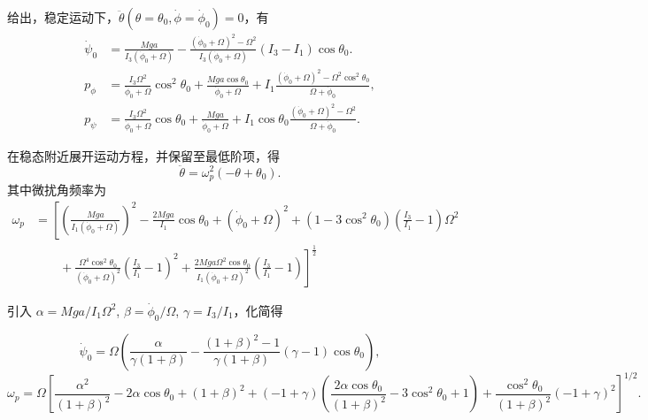 给出，稳定运动下，\(\ddot{\theta} (\theta = \theta_0, \dot{\phi} = \dot{\phi}_0) = 0\)，有
\begin{align*}
	\dot{\psi}_0 & = \frac{M g a}{I_3 (\dot{\phi}_0 + \Omega)} - \frac{(\dot{\phi}_0 + \Omega)^2 - \Omega^2}{I_3 (\dot{\phi}_0 + \Omega)} (I_3 - I_1) \cos \theta_0.                                                        \\
	p_{\phi}     & = \frac{I_3 \Omega^2}{\dot{\phi}_0 + \Omega} \cos^2 \theta_0 + \frac{Mga \cos \theta_0}{\dot{\phi}_0 + \Omega} + I_1 \frac{(\dot{\phi}_0 + \Omega)^2 - \Omega^2 \cos^2 \theta_0}{\Omega + \dot{\phi}_0}, \\
	p_{\psi}     & = \frac{I_3 \Omega^2}{\dot{\phi}_0 + \Omega} \cos \theta_0 + \frac{Mga}{\dot{\phi}_0 + \Omega} + I_1 \cos \theta_0 \frac{(\dot{\phi}_0 + \Omega)^2 - \Omega^2}{\Omega + \dot{\phi}_0}.
\end{align*}

在稳态附近展开运动方程，并保留至最低阶项，得
\begin{equation*}
	\ddot{\theta} =\omega_p^2 (-\theta + \theta_0).
\end{equation*}
其中微扰角频率为
\begin{align*}
	\omega_p & =\left[ \left( \frac{M g a}{I_1 (\dot{\phi}_0 + \Omega)} \right)^2 - \frac{2 M g a}{I_1} \cos \theta_0 + (\dot{\phi}_0 + \Omega)^2 \right. + (1 - 3 \cos^2 \theta_0) \left( \frac{I_3}{I_1} - 1 \right) \Omega^2 \\&\qquad+ \frac{\Omega^4 \cos^2 \theta_0}{(\dot{\phi}_0 + \Omega)^2} \left( \frac{I_3}{I_1} - 1 \right)^2 + \left. \frac{2 M g a \Omega^2 \cos \theta_0}{I_1 (\dot{\phi}_0 + \Omega)^2} \left( \frac{I_3}{I_1} - 1 \right) \right]^{\frac{1}{2}}
\end{align*}

引入 \(\alpha = M g a/I_1 \Omega^2\), \(\beta = \dot{\phi}_0/\Omega\), \(\gamma = I_3/I_1\)，化简得

\begin{equation*}
	\dot{\psi}_0 = \Omega \left( \frac{\alpha}{\gamma (1 + \beta)} - \frac{(1 + \beta)^2 - 1}{\gamma (1 + \beta)} (\gamma - 1) \cos \theta_0 \right),
\end{equation*}
\begin{equation*}
	\omega_p = \Omega \left[ \frac{\alpha^2}{(1 + \beta)^2} - 2 \alpha \cos \theta_0 + (1 + \beta)^2 \right.+ (-1 + \gamma) \left( \frac{2 \alpha \cos \theta_0}{(1 + \beta)^2} - 3 \cos^2 \theta_0 + 1 \right) + \left. \frac{\cos^2 \theta_0}{(1 + \beta)^2} (-1 + \gamma)^2 \right]^{1/2}.
\end{equation*}

